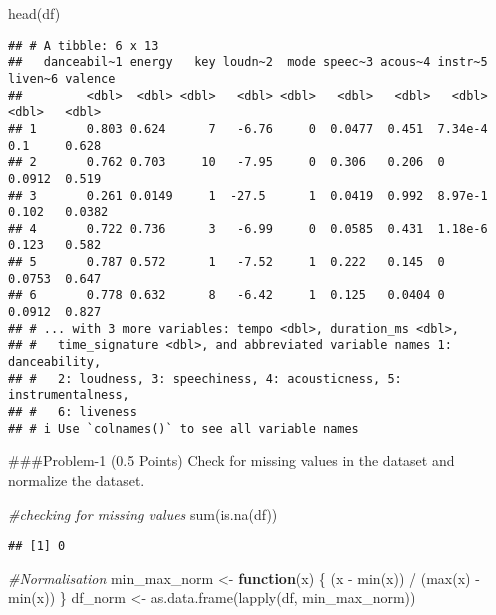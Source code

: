 \documentclass[
]{article}
\newenvironment{Shaded}{\begin{snugshade}}{\end{snugshade}}
\newcommand{\CommentTok}[1]{\textcolor[rgb]{0.56,0.35,0.01}{\textit{#1}}}
\newcommand{\ControlFlowTok}[1]{\textcolor[rgb]{0.13,0.29,0.53}{\textbf{#1}}}
\newcommand{\FunctionTok}[1]{\textcolor[rgb]{0.00,0.00,0.00}{#1}}
\newcommand{\NormalTok}[1]{#1}
\newcommand{\OtherTok}[1]{\textcolor[rgb]{0.56,0.35,0.01}{#1}}
\newcommand{\SpecialCharTok}[1]{\textcolor[rgb]{0.00,0.00,0.00}{#1}}
\begin{document}
\begin{Shaded}
\begin{Highlighting}[]
\FunctionTok{head}\NormalTok{(df)}
\end{Highlighting}
\end{Shaded}

\begin{verbatim}
## # A tibble: 6 x 13
##   danceabil~1 energy   key loudn~2  mode speec~3 acous~4 instr~5 liven~6 valence
##         <dbl>  <dbl> <dbl>   <dbl> <dbl>   <dbl>   <dbl>   <dbl>   <dbl>   <dbl>
## 1       0.803 0.624      7   -6.76     0  0.0477  0.451  7.34e-4  0.1     0.628 
## 2       0.762 0.703     10   -7.95     0  0.306   0.206  0        0.0912  0.519 
## 3       0.261 0.0149     1  -27.5      1  0.0419  0.992  8.97e-1  0.102   0.0382
## 4       0.722 0.736      3   -6.99     0  0.0585  0.431  1.18e-6  0.123   0.582 
## 5       0.787 0.572      1   -7.52     1  0.222   0.145  0        0.0753  0.647 
## 6       0.778 0.632      8   -6.42     1  0.125   0.0404 0        0.0912  0.827 
## # ... with 3 more variables: tempo <dbl>, duration_ms <dbl>,
## #   time_signature <dbl>, and abbreviated variable names 1: danceability,
## #   2: loudness, 3: speechiness, 4: acousticness, 5: instrumentalness,
## #   6: liveness
## # i Use `colnames()` to see all variable names
\end{verbatim}

\#\#\#Problem-1 (0.5 Points) Check for missing values in the dataset and
normalize the dataset.

\begin{Shaded}
\begin{Highlighting}[]
\CommentTok{\#checking for missing values}
\FunctionTok{sum}\NormalTok{(}\FunctionTok{is.na}\NormalTok{(df))}
\end{Highlighting}
\end{Shaded}

\begin{verbatim}
## [1] 0
\end{verbatim}

\begin{Shaded}
\begin{Highlighting}[]
\CommentTok{\#Normalisation}
\NormalTok{min\_max\_norm }\OtherTok{\textless{}{-}} \ControlFlowTok{function}\NormalTok{(x) \{}
\NormalTok{  (x }\SpecialCharTok{{-}} \FunctionTok{min}\NormalTok{(x)) }\SpecialCharTok{/}\NormalTok{ (}\FunctionTok{max}\NormalTok{(x) }\SpecialCharTok{{-}} \FunctionTok{min}\NormalTok{(x))}
\NormalTok{\}}
\NormalTok{df\_norm }\OtherTok{\textless{}{-}} \FunctionTok{as.data.frame}\NormalTok{(}\FunctionTok{lapply}\NormalTok{(df, min\_max\_norm))}
\end{Highlighting}
\end{Shaded}
\end{document}
